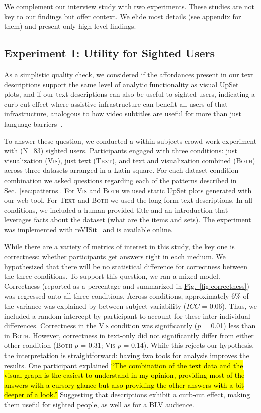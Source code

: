 \documentclass{egpubl}
\newcommand\asLink[2]{\textcolor{linkColor}{\href{#1}{\ul{#2}}}}
\newcommand{\secref}[1]{\hyperref[#1]{Sec.~\ref*{#1}}}
\newcommand{\figref}[1]{\hyperref[#1]{Fig.~\ref*{#1}}}
\newcommand{\hlc}[2][yellow]{{\colorlet{foo}{#1}\sethlcolor{foo}\hl{#2}}}
\newcommand\sqt[1]{\hlc[surveyQuoteColor!20]{``#1''}}
\newcommand{\numSurvey}{83}
\newcommand{\condition}[1]{\textsc{#1}}
\newcommand{\condVis}{\condition{Vis}}
\newcommand{\condText}{\condition{Text}}
\newcommand{\condBoth}{\condition{Both}}
\begin{document}
We complement our interview study with two experiments.
These studies are not key to our findings but offer context.
We elide most details (see appendix for them) and present only high level findings.

\subsection{Experiment 1: Utility for Sighted Users}

As a simplistic quality check, we considered if the affordances present in our text descriptions support the same level of analytic functionality as visual UpSet plots, and if our text descriptions can also be useful to sighted users, indicating a curb-cut effect where assistive infrastructure can benefit all users of that infrastructure, analogous to how video subtitles are useful for more than just language barriers~\cite{lundgard_accessible_2022, prasad_text_2012}.

To answer these question, we conducted a within-subjects crowd-work experiment with (N=\numSurvey{}) sighted users. Participants engaged with three conditions: just visualization (\condVis{}), just text (\condText{}), and text and visualization combined (\condBoth{}) across three datasets arranged in a Latin square.
For each dataset-condition combination we asked questions regarding each of the patterns described in \secref{sec:patterns}.
For \condVis{} and \condBoth{} we used static UpSet plots generated with our web tool.
For \condText{} and \condBoth{} we used the long form text-descriptions. In all conditions, we included a human-provided title and an introduction that leverages facts about the dataset (what are the items and sets). The experiment was implemented with reVISit~\cite{ding_revisit_2023} and is available \asLink{https://vdl.sci.utah.edu/Upset-alttxt-study/Upset-Alttext-User-Survey/}{online}.

While there are a variety of metrics of interest in this study, the key one is correctness: whether participants get answers right in each medium.
We hypothesized that there will be no statistical difference for correctness between the three conditions.
To support this question, we ran a mixed model. Correctness (reported as a percentage and summarized in \figref{fig:correctness}) was regressed onto all three conditions. Across conditions, approximately 6\% of the variance was explained by between-subject variability ($ICC$ = 0.06). Thus, we included a random intercept by participant to account for these inter-individual differences.
Correctness in the \condVis{} condition was significantly ($p$ = 0.01) less than in \condBoth{}.
However, correctness in text-only did not significantly differ from either other condition (\condBoth{} $p$ = 0.31; \condVis{} $p$ = 0.14).
While this rejects our hypothesis, the interpretation is straightforward: having two tools for analysis improves the results.
One participant explained \sqt{The combination of the text data and the visual graph is the easiest to understand in my opinion, providing most of the answers with a cursory glance but also providing the other answers with a bit deeper of a look.}
Suggesting that descriptions exhibit a curb-cut effect, making them useful for sighted people, as well as for a BLV audience.
\end{document}
